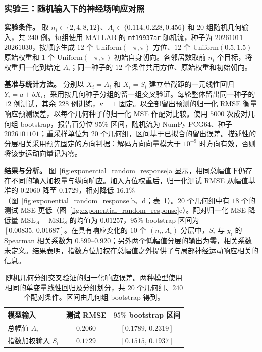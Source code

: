 \documentclass[UTF8,fontset=windows,11pt]{ctexart}
\begin{document}
\subsubsection{实验三：随机输入下的神经场响应对照}

\textbf{实验条件。} 取 $n_i\in\{2,4,8,12\}$、$A_i\in\{0.114,0.228,0.456\}$ 和 $20$ 组随机几何输入，共 $240$ 例。每组使用 MATLAB 的 \texttt{mt19937ar} 随机流，种子为 $20261011$--$20261030$，按顺序生成 $12$ 个 $\mathrm{Uniform}(-\pi,\pi)$ 方位、$12$ 个 $\mathrm{Uniform}(0.5,1.5)$ 原始权重和 $1$ 个 $\mathrm{Uniform}(-\pi,\pi)$ 初始自身朝向。各邻居数取前 $n_i$ 个目标，将权重归一化到给定 $A_i$；同一种子的 $12$ 个条件共用方位、原始权重和初始朝向。

\textbf{基准与统计方法。} 分别以 $X_i=A_i$ 和 $X_i=S_i$ 建立带截距的一元线性回归 $Y_i=a+bX_i$，采用按几何种子分组的留一组交叉验证。每轮整体留出同一种子的 $12$ 例测试，其余 $228$ 例训练，$\kappa=1$ 固定。以全部留出预测的归一化 RMSE 衡量响应预测误差，以每个几何种子的归一化 MSE 作配对比较。使用 $5000$ 次成对几何组 bootstrap，报告百分位 $95\%$ 区间，随机流为 NumPy PCG64、种子 $2026101101$；重采样单位为 $20$ 个几何组，区间基于已拟合的留出误差。描述性的分层相关采用预先固定的方向判据：解码方向向量模大于 $10^{-9}$ 时方向有效，否则将该步运动向量记为零。

\textbf{结果与分析。} 图~\ref{fig:exponential_random_response}a 显示，相同总幅值下仍存在不同的输入加权量与纵向响应。加入方位权重后，归一化测试 RMSE 从幅值基准的 $0.2060$ 降至 $0.1729$，相对降低 $16.1\%$（图~\ref{fig:exponential_random_response}b、d；表~\ref{tab:exponential_response}）。$20$ 个几何组中有 $18$ 个的测试 MSE 更低（图~\ref{fig:exponential_random_response}c）。配对归一化 MSE 降低量 $\mathrm{MSE}_A-\mathrm{MSE}_S$ 的均值为 $0.01257$，$95\%$ bootstrap 区间为 $[0.00835,\,0.01687]$。在具有响应变化的 $10$ 个 $(n_i,A_i)$ 分层中，$S_i$ 与 $y_i$ 的 Spearman 相关系数为 $0.599$--$0.920$；另外两个低幅值分层的输出为零，相关系数未定义。结果表明，指数方位加权在总幅值之外提供了与局部神经运动响应相关的信息。

\begin{table}[htbp]
 \centering
 \caption{随机几何分组交叉验证的归一化响应误差。两种模型使用相同的单变量线性回归及分组划分，共 $20$ 个几何组、$240$ 个配对条件。区间由几何组 bootstrap 得到。}
 \label{tab:exponential_response}
 \begin{tabular}{lcc}
  \toprule
  模型输入 & 测试 RMSE & $95\%$ bootstrap 区间\\
  \midrule
  总幅值 $A_i$ & $0.2060$ & $[0.1789,\,0.2319]$\\
  指数加权输入 $S_i$ & $0.1729$ & $[0.1515,\,0.1937]$\\
  \bottomrule
 \end{tabular}
\end{table}
\end{document}
